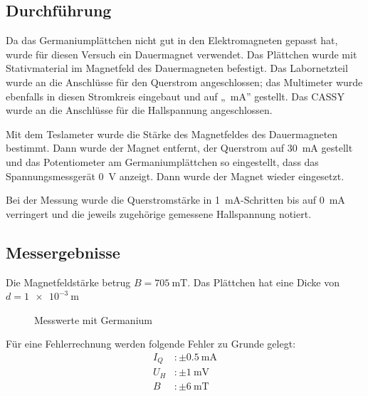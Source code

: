 \subsection{Durchführung}
Da das Germaniumplättchen nicht gut in den Elektromagneten gepasst hat, wurde für diesen Versuch ein Dauermagnet verwendet. Das Plättchen wurde mit Stativmaterial im Magnetfeld des Dauermagneten befestigt. Das Labornetzteil wurde an die Anschlüsse für den Querstrom angeschlossen; das Multimeter wurde ebenfalls in diesen Stromkreis eingebaut und auf „\SI{}{\milli\ampere}” gestellt. Das CASSY wurde an die Anschlüsse für die Hallspannung angeschlossen.

Mit dem Teslameter wurde die Stärke des Magnetfeldes des Dauermagneten bestimmt. Dann wurde der Magnet entfernt, der Querstrom auf \SI{30}{\milli\ampere} gestellt und das Potentiometer am Germaniumplättchen so eingestellt, dass das Spannungsmessgerät \SI{0}{\volt} anzeigt. Dann wurde der Magnet wieder eingesetzt.

Bei der Messung wurde die Querstromstärke in \SI{1}{\milli\ampere}-Schritten bis auf \SI{0}{\milli\ampere} verringert und die jeweils zugehörige gemessene Hallspannung notiert.

\subsection{Messergebnisse}
Die Magnetfeldstärke betrug $B=\SI{705}{\milli\tesla}$. Das Plättchen hat eine Dicke von $d=\SI{1e-3}{\meter}$

\begin{figure}[H]
\centering
{}
\caption{Messwerte mit Germanium}
\end{figure}

Für eine Fehlerrechnung werden folgende Fehler zu Grunde gelegt:
\begin{align*}
I_Q &: \pm \SI{0.5}{\milli\ampere} \\
U_H &: \pm \SI{1}{\milli\volt} \\
B &: \pm \SI{6}{\milli\tesla} \\
\end{align*}

